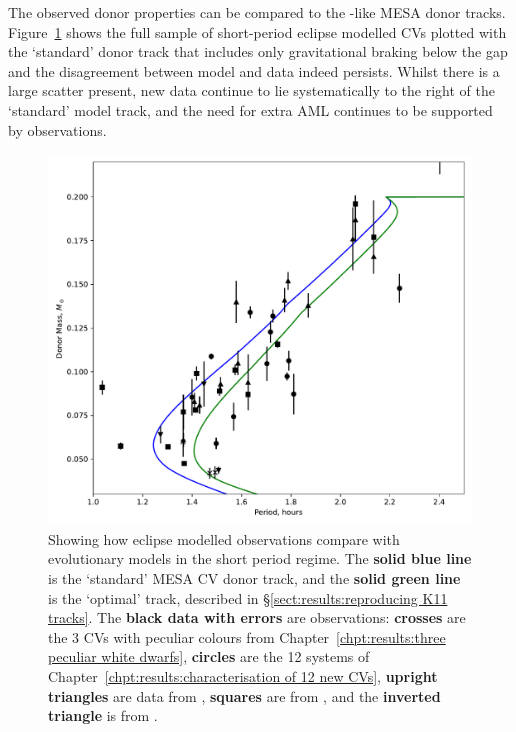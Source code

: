 The observed donor properties can be compared to the \citet{knigge11}-like MESA donor tracks. Figure~\ref{fig:discussion:donor model with eclipsers plotted} shows the full sample of short-period eclipse modelled CVs plotted with the `standard' donor track that includes only gravitational braking below the gap and the disagreement between model and data indeed persists. Whilst there is a large scatter present, new data continue to lie systematically to the right of the `standard' model track, and the need for extra AML continues to be supported by observations.
\begin{figure}
    \centering
    \includegraphics[width=\textwidth]{figures/results/Mdot/K11_donor_track_with_eclipse_modelled_data.pdf}
    \caption{Showing how eclipse modelled observations compare with evolutionary models in the short period regime. The {\bf solid blue line} is the `standard' MESA CV donor track, and the {\bf solid green line} is the `optimal' track, described in \S\ref{sect:results:reproducing K11 tracks}. The {\bf black data with errors} are observations: {\bf crosses} are the 3 CVs with peculiar colours from Chapter~\ref{chpt:results:three peculiar white dwarfs}, {\bf circles} are the 12 systems of Chapter~\ref{chpt:results:characterisation of 12 new CVs}, {\bf upright triangles} are data from \citet{McAllister2019}, {\bf squares} are from \citet{Savoury2011}, and the {\bf inverted triangle} is from \citet{mcallister2017b}.}
    \label{fig:discussion:donor model with eclipsers plotted}
\end{figure}

